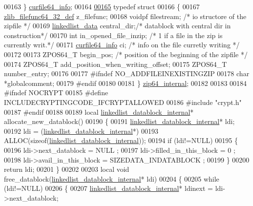 \begin{DoxyCode}
00163 \} \hyperlink{structcurfile64__info}{curfile64\_info};
00164 
\hyperlink{structzip64__internal}{00165} \textcolor{keyword}{typedef} \textcolor{keyword}{struct}
00166 \{
00167     \hyperlink{structzlib__filefunc64__32__def__s}{zlib\_filefunc64\_32\_def} z\_filefunc;
00168     voidpf filestream;        \textcolor{comment}{/* io structore of the zipfile */}
00169     \hyperlink{structlinkedlist__data__s}{linkedlist\_data} central\_dir;\textcolor{comment}{/* datablock with central dir in construction*/}
00170     \textcolor{keywordtype}{int}  in\_opened\_file\_inzip;  \textcolor{comment}{/* 1 if a file in the zip is currently writ.*/}
00171     \hyperlink{structcurfile64__info}{curfile64\_info} ci;            \textcolor{comment}{/* info on the file curretly writing */}
00172 
00173     ZPOS64\_T begin\_pos;            \textcolor{comment}{/* position of the beginning of the zipfile */}
00174     ZPOS64\_T add\_position\_when\_writing\_offset;
00175     ZPOS64\_T number\_entry;
00176 
00177 \textcolor{preprocessor}{#ifndef NO\_ADDFILEINEXISTINGZIP}
00178     \textcolor{keywordtype}{char} *globalcomment;
00179 \textcolor{preprocessor}{#endif}
00180 
00181 \} \hyperlink{structzip64__internal}{zip64\_internal};
00182 
00183 
00184 \textcolor{preprocessor}{#ifndef NOCRYPT}
00185 \textcolor{preprocessor}{#define INCLUDECRYPTINGCODE\_IFCRYPTALLOWED}
00186 \textcolor{preprocessor}{#include "crypt.h"}
00187 \textcolor{preprocessor}{#endif}
00188 
00189 local \hyperlink{structlinkedlist__datablock__internal__s}{linkedlist\_datablock\_internal}* allocate\_new\_datablock()
00190 \{
00191     \hyperlink{structlinkedlist__datablock__internal__s}{linkedlist\_datablock\_internal}* ldi;
00192     ldi = (\hyperlink{structlinkedlist__datablock__internal__s}{linkedlist\_datablock\_internal}*)
00193                  ALLOC(\textcolor{keyword}{sizeof}(\hyperlink{structlinkedlist__datablock__internal__s}{linkedlist\_datablock\_internal}));
00194     \textcolor{keywordflow}{if} (ldi!=NULL)
00195     \{
00196         ldi->next\_datablock = NULL ;
00197         ldi->filled\_in\_this\_block = 0 ;
00198         ldi->avail\_in\_this\_block = SIZEDATA\_INDATABLOCK ;
00199     \}
00200     \textcolor{keywordflow}{return} ldi;
00201 \}
00202 
00203 local \textcolor{keywordtype}{void} free\_datablock(\hyperlink{structlinkedlist__datablock__internal__s}{linkedlist\_datablock\_internal}* ldi)
00204 \{
00205     \textcolor{keywordflow}{while} (ldi!=NULL)
00206     \{
00207         \hyperlink{structlinkedlist__datablock__internal__s}{linkedlist\_datablock\_internal}* ldinext = ldi->next\_datablock;

\end{DoxyCode}
